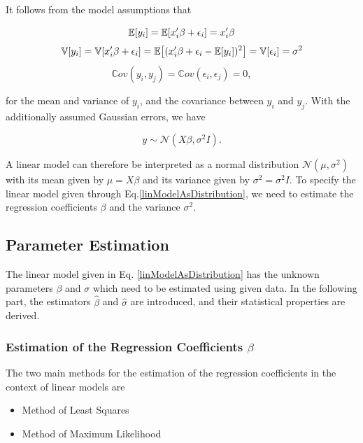\documentclass[10pt,a4paper]{article}
\begin{document}
It follows from the model assumptions that 

\begin{equation}
\mathbb E[y_i] = \mathbb E [x_i'\beta + \epsilon_i] = x_i'\beta \\
\end{equation}
\begin{equation}
\mathbb V[y_i] = \mathbb V[x_i'\beta + \epsilon_i] = \mathbb{E}\big[(x_i'\beta + \epsilon_i - \mathbb{E}[y_i])^2\big] = \mathbb V[\epsilon_i] = \sigma^2 \\
\end{equation}
\begin{equation}
\mathbb Cov(y_i, y_j) = \mathbb Cov(\epsilon_i, \epsilon_j) = 0, 
\end{equation}
	
for the mean and variance of $y_i$, and the covariance between $y_i$ and $y_j$. With the additionally assumed Gaussian errors, we have

\begin{equation} \label{linModelAsDistribution}
y \sim \mathcal N(X\beta, \sigma^2 I).
\end{equation}

A linear model can therefore be interpreted as a normal distribution $\mathcal N(\mu, \sigma^2)$ with its mean given by $\mu = X\beta$ and its variance given by $\sigma^2 = \sigma^2 I$. To specify the linear model given through Eq.\ref{linModelAsDistribution}, we need to estimate the regression coefficients $\beta$ and the variance $\sigma^2$.


\subsection{Parameter Estimation}

The linear model given in Eq. \ref{linModelAsDistribution} has the unknown parameters $\beta$ and $\sigma$ which need to be estimated using given data. In the following part, the estimators $\hat \beta$ and $\hat \sigma$ are introduced, and their statistical properties are derived. 

\subsubsection{Estimation of the Regression Coefficients $\beta$}

The two main methods for the estimation of the regression coefficients in the context of linear models are

\begin{itemize}
	\item Method of Least Squares
	\item Method of Maximum Likelihood
\end{itemize}	
\end{document}
